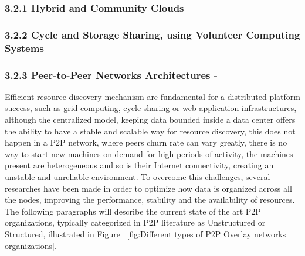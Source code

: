 \documentclass{./llncs2e/llncs}
\begin{document}
\subsubsection{3.2.1 Hybrid and Community Clouds}




\subsubsection{3.2.2 Cycle and Storage Sharing, using Volunteer Computing Systems}




\subsubsection{3.2.3 Peer-to-Peer Networks Architectures -}  
Efficient resource discovery mechanism are fundamental for a distributed platform success, such as grid computing, cycle sharing or web application infrastructures\cite{Ranjan2006}, although the centralized model, keeping data bounded inside a data center offers the ability to have a stable and scalable way for resource discovery, this does not happen in a P2P network, where peers churn rate can vary greatly, there is no way to start new machines on demand for high periods of activity, the machines present are heterogeneous and so is their Internet connectivity, creating an unstable and unreliable environment. To overcome this challenges, several researches have been made in order to optimize how data is organized across all the nodes, improving the performance, stability and the availability of resources. The following paragraphs will describe the current state of the art P2P organizations, typically categorized in P2P literature as Unstructured or Structured\cite{Milojicic2003}, illustrated in Figure ~\ref{fig:Different types of P2P Overlay networks organizations}.
\end{document}
